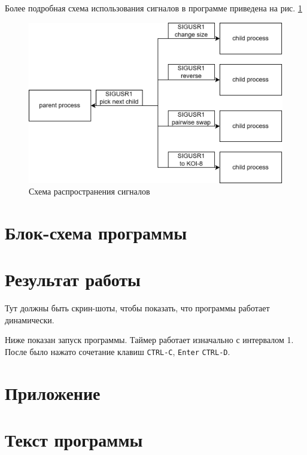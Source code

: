 Более подробная схема использования сигналов в программе приведена на рис. \ref{fig:signals}

\begin{figure}[h]
    \centering
    \includegraphics[width=0.6\linewidth]{images/lab1_signals.drawio.png}
    \caption{Схема распространения сигналов}
    \label{fig:signals}
\end{figure}

\newpage

\section*{Блок-схема программы}


\newpage

\section*{Результат работы}

Тут должны быть скрин-шоты, чтобы показать, что программы работает
динамически.

Ниже показан запуск программы. Таймер работает изначально с интервалом 1.
После было нажато сочетание клавиш \texttt{CTRL-C}, \texttt{Enter}
\texttt{CTRL-D}.

\newpage

\appendix

\section*{Приложение}
\section*{Текст программы}

